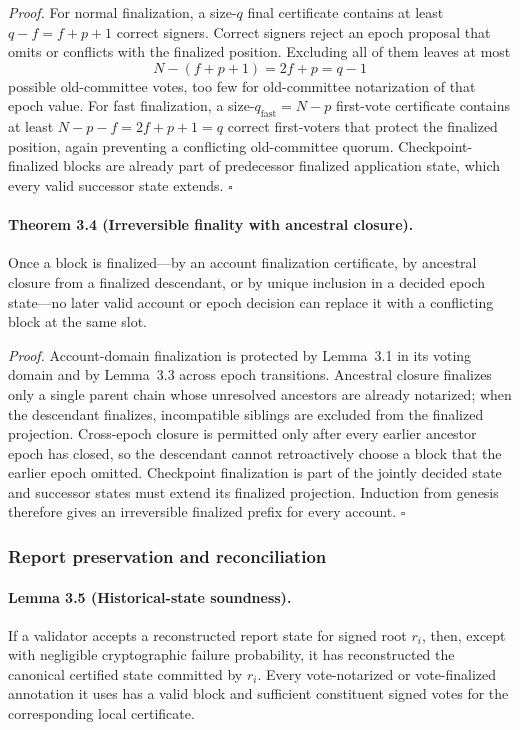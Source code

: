 \documentclass[10pt,twocolumn]{article}
\begin{document}
\emph{Proof.} For normal finalization, a size-$q$ final certificate contains at least $q-f=f+p+1$ correct signers. Correct signers reject an epoch proposal that omits or conflicts with the finalized position. Excluding all of them leaves at most
\begin{equation}
N-(f+p+1)=2f+p=q-1
\end{equation}
possible old-committee votes, too few for old-committee notarization of that epoch value. For fast finalization, a size-$q_{\mathrm{fast}}=N-p$ first-vote certificate contains at least $N-p-f=2f+p+1=q$ correct first-voters that protect the finalized position, again preventing a conflicting old-committee quorum. Checkpoint-finalized blocks are already part of predecessor finalized application state, which every valid successor state extends. $\square$

\paragraph{Theorem 3.4 (Irreversible finality with ancestral closure).} Once a block is finalized---by an account finalization certificate, by ancestral closure from a finalized descendant, or by unique inclusion in a decided epoch state---no later valid account or epoch decision can replace it with a conflicting block at the same slot.

\emph{Proof.} Account-domain finalization is protected by Lemma~3.1 in its voting domain and by Lemma~3.3 across epoch transitions. Ancestral closure finalizes only a single parent chain whose unresolved ancestors are already notarized; when the descendant finalizes, incompatible siblings are excluded from the finalized projection. Cross-epoch closure is permitted only after every earlier ancestor epoch has closed, so the descendant cannot retroactively choose a block that the earlier epoch omitted. Checkpoint finalization is part of the jointly decided state and successor states must extend its finalized projection. Induction from genesis therefore gives an irreversible finalized prefix for every account. $\square$

\subsubsection{Report preservation and reconciliation}
\paragraph{Lemma 3.5 (Historical-state soundness).} If a validator accepts a reconstructed report state for signed root $r_i$, then, except with negligible cryptographic failure probability, it has reconstructed the canonical certified state committed by $r_i$. Every vote-notarized or vote-finalized annotation it uses has a valid block and sufficient constituent signed votes for the corresponding local certificate.
\end{document}
